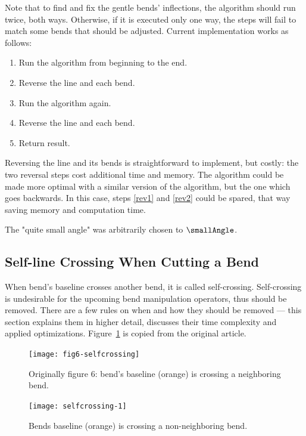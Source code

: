 \documentclass[a4paper]{article}
\begin{document}
Note that to find and fix the gentle bends' inflections, the algorithm should
run twice, both ways. Otherwise, if it is executed only one way, the steps will
fail to match some bends that should be adjusted. Current implementation works
as follows:

\begin{enumerate}
    \item Run the algorithm from beginning to the end.
    \item \label{rev1} Reverse the line and each bend.
    \item Run the algorithm again.
    \item \label{rev2} Reverse the line and each bend.
    \item Return result.
\end{enumerate}

Reversing the line and its bends is straightforward to implement, but costly:
the two reversal steps cost additional time and memory. The algorithm could be
made more optimal with a similar version of the algorithm, but the one which
goes backwards. In this case, steps \ref{rev1} and \ref{rev2} could be spared,
that way saving memory and computation time.

The "quite small angle" was arbitrarily chosen to $\smallAngle$.

\subsection{Self-line Crossing When Cutting a Bend}

When bend's baseline crosses another bend, it is called self-crossing.
Self-crossing is undesirable for the upcoming bend manipulation operators, thus
should be removed. There are a few rules on when and how they should be removed
--- this section explains them in higher detail, discusses their time
complexity and applied optimizations. Figure~\ref{fig:fig6-selfcrossing} is
copied from the original article.

\begin{figure}[ht]
    \centering
    \texttt{[image: fig6-selfcrossing]}
    \caption{Originally figure 6: bend's baseline (orange) is crossing a neighboring bend.}
    \label{fig:fig6-selfcrossing}
\end{figure}

\begin{figure}[ht]
    \centering
    \texttt{[image: selfcrossing-1]}
    \caption{Bends baseline (orange) is crossing a non-neighboring bend.}
    \label{fig:selfcrossing-1-non-neighbor}
\end{figure}
\end{document}
